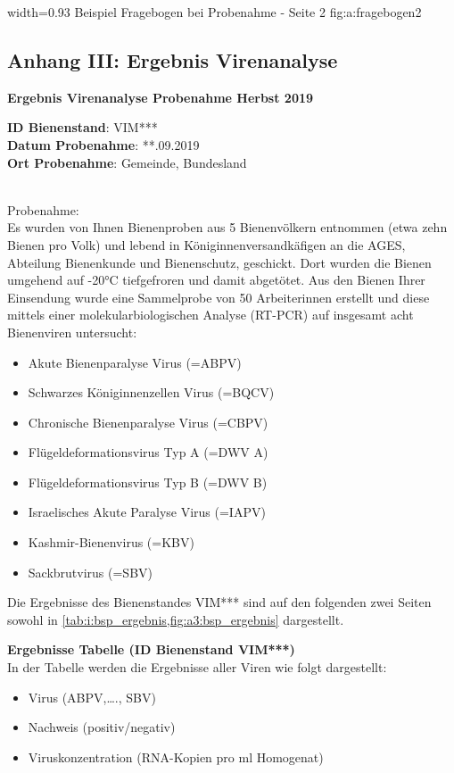   {width=0.93\textwidth} %
  {Beispiel Fragebogen bei Probenahme - Seite 2} %
  {} %
  {fig:a:fragebogen2} %

\subsection{Anhang III: Ergebnis Virenanalyse}
\label{chap:anhang_Ergebnis}

\textbf{Ergebnis Virenanalyse Probenahme Herbst 2019}

\textbf{ID Bienenstand}: VIM***\\
\textbf{Datum Probenahme}: **.09.2019\\
\textbf{Ort Probenahme}: Gemeinde, Bundesland\\\

Probenahme:\\
Es wurden von Ihnen Bienenproben aus 5 Bienenvölkern entnommen (etwa zehn Bienen pro
Volk) und lebend in Königinnenversandkäfigen an die AGES, Abteilung Bienenkunde und
Bienenschutz, geschickt. Dort wurden die Bienen umgehend auf -20°C tiefgefroren und damit
abgetötet. Aus den Bienen Ihrer Einsendung wurde eine Sammelprobe von 50 Arbeiterinnen
erstellt und diese mittels einer molekularbiologischen Analyse (RT-PCR) auf insgesamt acht
Bienenviren untersucht:

\begin{itemize}
    \item Akute Bienenparalyse Virus (=ABPV)
    \item Schwarzes Königinnenzellen Virus (=BQCV)
    \item Chronische Bienenparalyse Virus (=CBPV)
    \item Flügeldeformationsvirus Typ A (=DWV A)
    \item Flügeldeformationsvirus Typ B (=DWV B)
    \item Israelisches Akute Paralyse Virus (=IAPV)
    \item Kashmir-Bienenvirus (=KBV)
    \item Sackbrutvirus (=SBV)
\end{itemize}

Die Ergebnisse des Bienenstandes VIM*** sind auf den folgenden zwei Seiten sowohl in \cref{tab:i:bsp_ergebnis,fig:a3:bsp_ergebnis} dargestellt.

\textbf{Ergebnisse Tabelle (ID Bienenstand VIM***)}\\
In der Tabelle werden die Ergebnisse aller Viren wie folgt dargestellt:
\begin{itemize}
    \item Virus (ABPV,…., SBV)
    \item Nachweis (positiv/negativ)
    \item Viruskonzentration (RNA-Kopien pro ml Homogenat)
\end{itemize}


